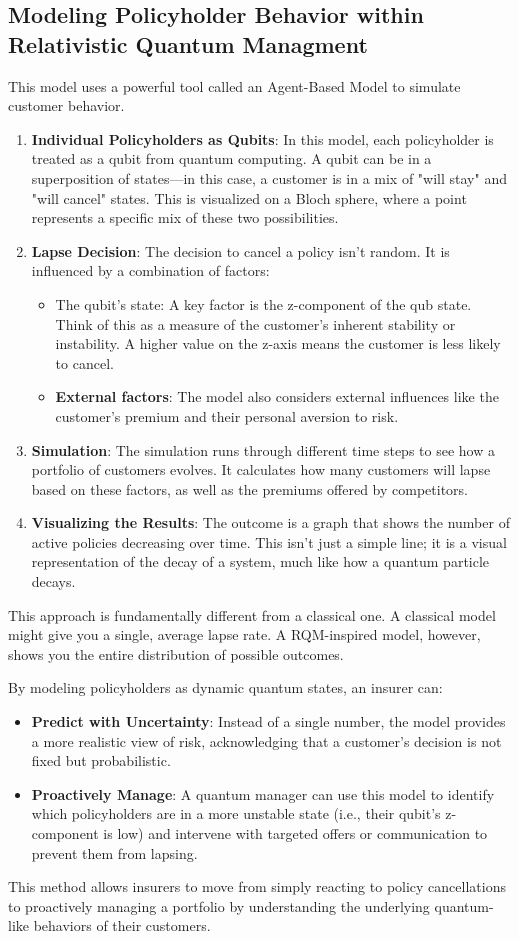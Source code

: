 \documentclass{article}
\begin{document}
\subsection{Modeling Policyholder Behavior within Relativistic Quantum Managment}
This model uses a powerful tool called an Agent-Based Model to simulate customer behavior.
\begin{enumerate}
\item \textbf{Individual Policyholders as Qubits}: In this model, each policyholder is treated as a qubit from quantum computing. A qubit can be in a superposition of states---in this case, a customer is in a mix of "will stay" and "will cancel" states. This is visualized on a Bloch sphere, where a point represents a specific mix of these two possibilities.
\item \textbf{Lapse Decision}: The decision to cancel a policy isn't random. It is influenced by a combination of factors:
\begin{itemize}
\item The qubit's state: A key factor is the z-component of the qub state. Think of this as a measure of the customer's inherent stability or instability. A higher value on the z-axis means the customer is less likely to cancel.
\item \textbf{External factors}: The model also considers external influences like the customer's premium and their personal aversion to risk.
\end{itemize}
\item \textbf{Simulation}: The simulation runs through different time steps to see how a portfolio of customers evolves. It calculates how many customers will lapse based on these factors, as well as the premiums offered by competitors.
\item \textbf{Visualizing the Results}: The outcome is a graph that shows the number of active policies decreasing over time. This isn't just a simple line; it is a visual representation of the decay of a system, much like how a quantum particle decays.
\end{enumerate}


This approach is fundamentally different from a classical one. A classical model might give you a single, average lapse rate. A RQM-inspired model, however, shows you the entire distribution of possible outcomes.

By modeling policyholders as dynamic quantum states, an insurer can:
\begin{itemize}
\item \textbf{Predict with Uncertainty}: Instead of a single number, the model provides a more realistic view of risk, acknowledging that a customer's decision is not fixed but probabilistic.
\item \textbf{Proactively Manage}: A quantum manager can use this model to identify which policyholders are in a more unstable state (i.e., their qubit's z-component is low) and intervene with targeted offers or communication to prevent them from lapsing.
\end{itemize}
This method allows insurers to move from simply reacting to policy cancellations to proactively managing a portfolio by understanding the underlying quantum-like behaviors of their customers.
\end{document}
